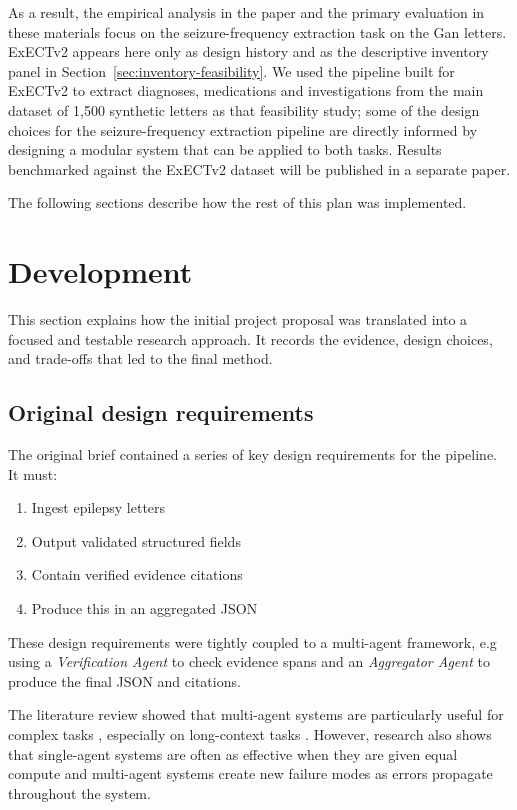 \documentclass[conference]{IEEEtran}
\begin{document}
As a result, the empirical analysis in the paper and the 
primary evaluation in these materials focus on the 
seizure-frequency extraction task on the Gan letters. 
ExECTv2 appears here only as design history and as the 
descriptive inventory panel in 
Section~\ref{sec:inventory-feasibility}. We used the 
pipeline built for ExECTv2 to extract diagnoses, medications
and investigations from the main dataset of 1,500
synthetic letters as that feasibility study; some of the 
design choices for the seizure-frequency extraction
pipeline are directly informed by designing a modular
system that can be applied to both tasks. Results 
benchmarked against the ExECTv2 dataset will
be published in a separate paper.

The following sections describe how the rest of this 
plan was implemented.

\section{Development}

This section explains how the initial project proposal was 
translated into a focused and testable research approach. 
It records the evidence, design choices, and trade-offs 
that led to the final method.

\subsection{Original design requirements}

The original brief contained a series of key design 
requirements for the pipeline. It must:

\vspace{0.2em}
\begin{enumerate}
\item Ingest epilepsy letters
\item Output validated structured fields 
\item Contain verified evidence citations
\item Produce this in an aggregated JSON
\end{enumerate}
\vspace{0.2em}

These design requirements were tightly coupled to a 
multi-agent framework, e.g using a \emph{Verification Agent} 
to check evidence spans and an \emph{Aggregator Agent}
to produce the final JSON and citations. 

The literature review showed that multi-agent systems
are particularly useful for complex tasks \cite{b25},
especially on long-context tasks \cite{b26}. 
However, research also shows that single-agent systems
are often as effective when they are given equal compute 
and multi-agent systems create new failure modes 
as errors propagate throughout the system\cite{b26}.
\end{document}
